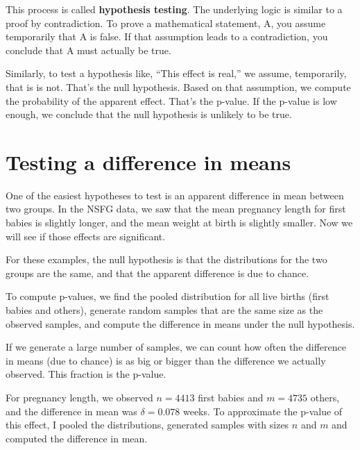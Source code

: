 \documentclass[12pt]{book}
\begin{document}
This process is called {\bf hypothesis testing}.  The underlying
logic is similar to a proof by contradiction.  To prove a mathematical
statement, A, you assume temporarily that A is false.  If that
assumption leads to a contradiction, you conclude that A must actually
be true.


Similarly, to test a hypothesis like, ``This effect is real,'' we
assume, temporarily, that is is not.  That's the null hypothesis.
Based on that assumption, we compute the probability of the apparent
effect.  That's the p-value.  If the p-value is low enough, we
conclude that the null hypothesis is unlikely to be true.


\section{Testing a difference in means}

One of the easiest hypotheses to test is an apparent difference in mean
between two groups.  In the NSFG data, we saw that the mean pregnancy
length for first babies is slightly longer, and the mean weight at
birth is slightly smaller.  Now we will see if those effects are
significant.


For these examples, the null hypothesis is that the distributions
for the two groups are the same, and that the apparent difference is
due to chance.


To compute p-values, we find the pooled distribution for all live
births (first babies and others), generate random samples that are
the same size as the observed samples, and compute the difference
in means under the null hypothesis.


If we generate a large number of samples, we can count how often the
difference in means (due to chance) is as big or bigger than the
difference we actually observed.  This fraction is the p-value.

For pregnancy length, we observed $n=4413$ first babies and $m=4735$
others, and the difference in mean was $\delta=0.078$ weeks.  To
approximate the p-value of this effect, I pooled the distributions,
generated samples with sizes $n$ and $m$ and computed the difference
in mean.
\end{document}
